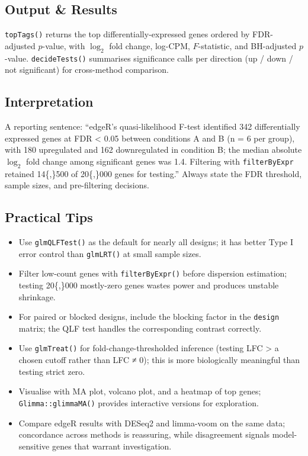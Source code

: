 \documentclass[
]{article}
\providecommand{\tightlist}{%
  \setlength{\itemsep}{0pt}\setlength{\parskip}{0pt}}
\begin{document}
\subsection{Output \& Results}\label{output-results}

\texttt{topTags()} returns the top differentially-expressed genes
ordered by FDR-adjusted \(p\)-value, with \(\log_2\) fold change,
log-CPM, \(F\)-statistic, and BH-adjusted \(p\)-value.
\texttt{decideTests()} summarises significance calls per direction (up /
down / not significant) for cross-method comparison.

\subsection{Interpretation}\label{interpretation}

A reporting sentence: ``edgeR's quasi-likelihood F-test identified 342
differentially expressed genes at FDR \textless{} 0.05 between
conditions A and B (n = 6 per group), with 180 upregulated and 162
downregulated in condition B; the median absolute \(\log_2\) fold change
among significant genes was 1.4. Filtering with \texttt{filterByExpr}
retained 14\{,\}500 of 20\{,\}000 genes for testing.'' Always state the
FDR threshold, sample sizes, and pre-filtering decisions.

\subsection{Practical Tips}\label{practical-tips}

\begin{itemize}
\tightlist
\item
  Use \texttt{glmQLFTest()} as the default for nearly all designs; it
  has better Type I error control than \texttt{glmLRT()} at small sample
  sizes.
\item
  Filter low-count genes with \texttt{filterByExpr()} before dispersion
  estimation; testing 20\{,\}000 mostly-zero genes wastes power and
  produces unstable shrinkage.
\item
  For paired or blocked designs, include the blocking factor in the
  \texttt{design} matrix; the QLF test handles the corresponding
  contrast correctly.
\item
  Use \texttt{glmTreat()} for fold-change-thresholded inference (testing
  \textbar LFC\textbar{} \textgreater{} a chosen cutoff rather than LFC
  ≠ 0); this is more biologically meaningful than testing strict zero.
\item
  Visualise with MA plot, volcano plot, and a heatmap of top genes;
  \texttt{Glimma::glimmaMA()} provides interactive versions for
  exploration.
\item
  Compare edgeR results with DESeq2 and limma-voom on the same data;
  concordance across methods is reassuring, while disagreement signals
  model-sensitive genes that warrant investigation.
\end{itemize}
\end{document}
